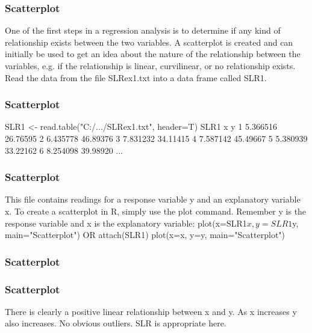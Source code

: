 
\begin{frame}[fragile]
\frametitle{Scatterplot}
One of the first steps in a regression analysis is to determine if any
kind of relationship exists between the two variables.
A scatterplot is created and can initially be used to get an idea
about the nature of the relationship between the variables, e.g. if
the relationship is linear, curvilinear, or no relationship exists.
Read the data from the file SLRex1.txt into a data frame called
SLR1.
\end{frame}
\begin{frame}[fragile]
\frametitle{Scatterplot}
SLR1 <- read.table("C:/.../SLRex1.txt", header=T)
SLR1
x y
1 5.366516 26.76595
2 6.435778 46.89376
3 7.831232 34.11415
4 7.587142 45.49667
5 5.380939 33.22162
6 8.254098 39.98920
...

\end{frame}
\begin{frame}[fragile]
\frametitle{Scatterplot}
This file contains readings for a response variable y and an
explanatory variable x.
To create a scatterplot in R, simply use the plot command.
Remember y is the response variable and x is the explanatory
variable:
plot(x=SLR1$x, y=SLR1$y, main="Scatterplot")
OR
attach(SLR1)
plot(x=x, y=y, main="Scatterplot")
\end{frame}
\begin{frame}[fragile]
\frametitle{Scatterplot}
\end{frame}
\begin{frame}[fragile]
\frametitle{Scatterplot}
There is clearly a positive linear relationship between x and y. As x
increases y also increases. No obvious outliers. SLR is appropriate
here.
\end{frame}


